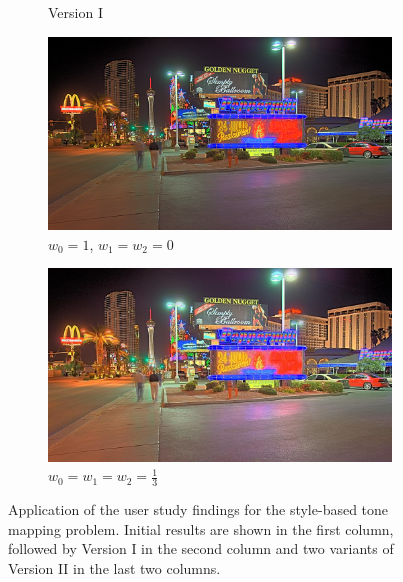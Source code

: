 {\begin{landscape}
\begin{figure}
\begin{subfigure}[b]{0.40\textwidth}
    \caption{Version I}
    \label{FigStyle:VerI_peppermill}
\end{subfigure}\hfill
\begin{subfigure}[b]{0.40\textwidth}
    \centering
    \includegraphics[width=\textwidth]{figures/chapter5/style_based/Peppermill_hdrcandy_w0_1.png}
    \caption{$w_0 = 1$, $w_1 = w_2 = 0$}
   \label{FigStyle:VerIIa_peppermill}
\end{subfigure}\hfill
\begin{subfigure}[b]{0.40\textwidth}
    \centering
    \includegraphics[width=\textwidth]{figures/chapter5/style_based/Peppermill_hdrcandy_w0_w1_w2_small.jpg}
    \caption{$w_0 = w_1 = w_2 = \frac{1}{3}$}
    \label{FigStyle:VerIIb_peppermill}
\end{subfigure}\hfill
\caption{Application of the user study findings for the style-based tone mapping
    problem.  Initial results are shown in the first column, followed
        by Version I in the second column and two variants of Version II
in the last two columns.}
\label{FigStyle}
\end{figure}
\end{landscape}}

